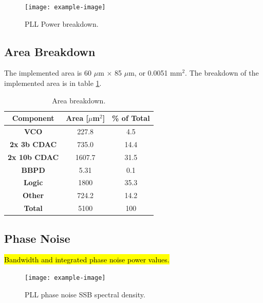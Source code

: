 		\begin{figure}[htb!]
	        \centering
	        \texttt{[image: example-image]}
		    \caption{PLL Power breakdown.}
		    \label{fig:pow_bkdn}
		\end{figure}

\subsection{Area Breakdown}
The implemented area is 60 $\mu$m $\times$ 85 $\mu$m, or 0.0051 mm$^2$. The breakdown of the implemented area is in table \ref{tab:area_bkdn}.

		\begin{table}[htb!]
			\centering
			\def\arraystretch{1.5}		
			\setlength\arrayrulewidth{0.75pt}
			\setlength{\tabcolsep}{1em} %
			\begin{tabular}{|c|c|c|}
				\hline 
				\rule[-1ex]{0pt}{2.5ex} \cellcolor{gray!40}\textbf{Component} & \cellcolor{gray!40}\textbf{Area [$\mu$m$^2$]} & \cellcolor{gray!40}\textbf{\% of Total}\\ 
				\hline 
				\rule[-1ex]{0pt}{2.5ex} \textbf{VCO} &  227.8 & 4.5  \\ 
				\hline 
				\rule[-1ex]{0pt}{2.5ex} \textbf{2x 3b CDAC} &  735.0 &  14.4  \\ 
				\hline 
				\rule[-1ex]{0pt}{2.5ex} \textbf{2x 10b CDAC} &  1607.7 &  31.5  \\ 
				\hline 
				\rule[-1ex]{0pt}{2.5ex} \textbf{BBPD} &  5.31 &  0.1  \\ 
				\hline 
				\rule[-1ex]{0pt}{2.5ex} \textbf{Logic} &  1800 &  35.3  \\ 
				\hline 
				\rule[-1ex]{0pt}{2.5ex} \textbf{Other} &  724.2 &  14.2  \\ 
				\hline 
				\rule[-1ex]{0pt}{2.5ex} \textbf{Total} &  5100 &  100  \\ 
				\hline 
			\end{tabular} 
			\caption{Area breakdown.}
			\label{tab:area_bkdn}
		\end{table}   


\subsection{Phase Noise}
	\hl{Bandwidth and integrated phase noise power values.}
		\begin{figure}[htb!]
	        \centering
	        \texttt{[image: example-image]}
		    \caption{PLL phase noise SSB spectral density.}
		    \label{fig:sim_pll_psd}
		\end{figure}

